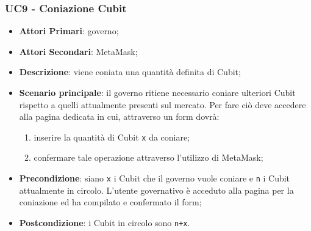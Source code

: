 \subsubsection{UC9 - Coniazione Cubit}
\begin{itemize}
	\item \textbf{Attori Primari}: governo;
	\item \textbf{Attori Secondari}: MetaMask\glo;
	\item \textbf{Descrizione}: viene coniata una quantità definita di Cubit\glo;
	
	\item \textbf{Scenario principale}: il governo ritiene necessario coniare ulteriori Cubit rispetto a quelli attualmente presenti sul mercato. Per fare ciò deve accedere alla pagina dedicata in cui, attraverso un form dovrà:
	 \begin{enumerate}[label=\alph*.]
		\item inserire la quantità di Cubit \texttt{x} da coniare;
		\item confermare tale operazione attraverso l'utilizzo di MetaMask\glo;
	\end{enumerate}
	\item \textbf{Precondizione}: siano \texttt{x} i Cubit che il governo vuole coniare e \texttt{n} i Cubit attualmente in circolo. L'utente governativo è acceduto alla pagina per la coniazione ed ha compilato e confermato il form;
	\item \textbf{Postcondizione}: i Cubit in circolo sono \texttt{n+x}.
\end{itemize}
